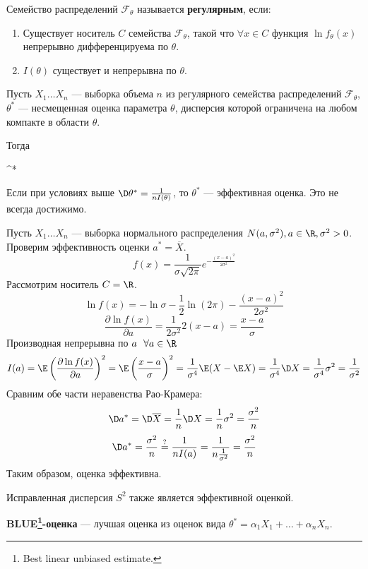 \begin{definition}
    Семейство распределений \(\mathcal{F}_\theta\) называется \textbf{регулярным}, если:
    \begin{enumerate}
        \item Существует носитель \(C\) семейства \(\mathcal{F}_\theta\), такой что \(\forall x \in C\) функция \(\ln f_\theta(x)\) непрерывно дифференцируема по \(\theta\).
        \item \(I(\theta)\) существует и непрерывна по \(\theta\).
    \end{enumerate}
\end{definition}

\begin{theorem}
    Пусть \(X_1 \dots X_n\) --- выборка объема \(n\) из регулярного семейства распределений \(\mathcal{F}_\theta\), \(\theta^*\) --- несмещенная оценка параметра \(\theta\), дисперсия которой ограничена на любом компакте в области \(\theta\).

    Тогда
    \begin{myemph}
        \D \theta^* \geq {}
    \end{myemph}
\end{theorem}
\begin{corollary}
    Если при условиях выше \(\D \theta^* = \frac{1}{n I(\theta)}\), то \(\theta^*\) --- эффективная оценка. Это не всегда достижимо.
\end{corollary}

\begin{example}
    Пусть \(X_1 \dots X_n\) --- выборка нормального распределения \(N(a, \sigma^2), a \in \R, \sigma^2 > 0\). Проверим эффективность оценки \(a^* = \overline{X}\).
    \[f(x) = \frac{1}{\sigma \sqrt{2 \pi}} e^{ - \frac{(x - a)^2}{2 \sigma^2}}\]
    Рассмотрим носитель \(C = \R\).
    \[\ln f(x) = - \ln \sigma - \frac{1}{2} \ln(2 \pi) - \frac{(x - a)^2}{2 \sigma^2}\]
    \[\frac{\partial \ln f(x)}{\partial a} = \frac{1}{2\sigma^2} 2(x - a) = \frac{x - a}{\sigma}\]
    Производная непрерывна по \(a \ \ \forall a \in \R\)
    \[I(a) = \E \left(\frac{\partial \ln f(x)}{\partial a}\right)^2 = \E \left(\frac{x - a}{\sigma}\right)^2 = \frac{1}{\sigma^4} \E (X - \E X) = \frac{1}{\sigma^4} \D X = \frac{1}{\sigma^4} \sigma^2 = \frac{1}{\sigma^2}\]
    Сравним обе части неравенства Рао-Крамера:
    \[\D a^* = \D \overline{X} = \frac{1}{n} \D X = \frac{1}{n} \sigma^2 = \frac{\sigma^2}{n}\]
    \[\D a^* = \frac{\sigma^2}{n} \stackrel{?}{ =} \frac{1}{n I(a)} = \frac{1}{n \frac{1}{\sigma^2}} = \frac{\sigma^2}{n}\]
    Таким образом, оценка эффективна.
\end{example}

\begin{remark}
    Исправленная дисперсия \(S^2\) также является эффективной оценкой.
\end{remark}

\begin{definition}
    \textbf{BLUE\footnote{Best linear unbiased estimate.}-оценка} --- лучшая оценка из оценок вида \(\theta^* = \alpha_1 X_1 + \dots + \alpha_n X_n\).
\end{definition}
